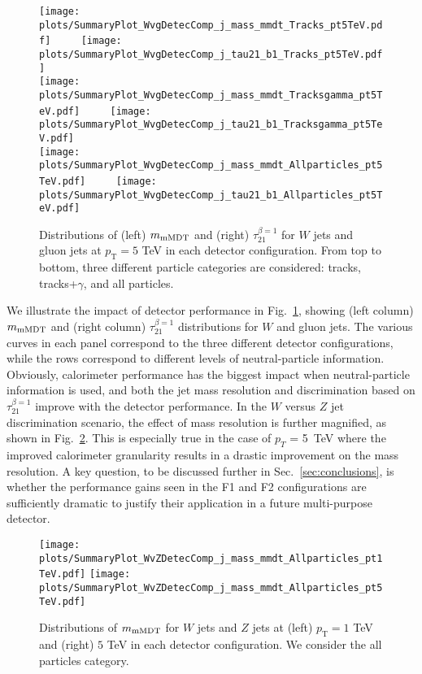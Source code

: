 \documentclass[11pt,letterpaper]{article}
\DeclareRobustCommand{\Sec}[1]{Sec.~\ref{#1}}
\DeclareRobustCommand{\Fig}[1]{Fig.~\ref{#1}}
\newcommand{\pt}{p_{\mathrm{T}}}
\begin{document}
\begin{figure}[p]
\begin{center}
\texttt{[image: plots/SummaryPlot\_WvgDetecComp\_j\_mass\_mmdt\_Tracks\_pt5TeV.pdf]}
$\qquad$
\texttt{[image: plots/SummaryPlot\_WvgDetecComp\_j\_tau21\_b1\_Tracks\_pt5TeV.pdf]}\\
\texttt{[image: plots/SummaryPlot\_WvgDetecComp\_j\_mass\_mmdt\_Tracksgamma\_pt5TeV.pdf]}
$\qquad$
\texttt{[image: plots/SummaryPlot\_WvgDetecComp\_j\_tau21\_b1\_Tracksgamma\_pt5TeV.pdf]}\\
\texttt{[image: plots/SummaryPlot\_WvgDetecComp\_j\_mass\_mmdt\_Allparticles\_pt5TeV.pdf]}
$\qquad$
\texttt{[image: plots/SummaryPlot\_WvgDetecComp\_j\_tau21\_b1\_Allparticles\_pt5TeV.pdf]}\\
\end{center}
\caption{Distributions of (left) ${m}_{\rm mMDT}$ and (right) $\tau_{21}^{\beta=1}$ for $W$ jets and gluon jets at $\pt = 5$ TeV in each detector configuration. From top to bottom, three different particle categories are considered: tracks, tracks+$\gamma$, and all particles.}
\label{fig:SummaryPlots_Wvq_DetectorComparison}
\end{figure}


We illustrate the impact of detector performance in \Fig{fig:SummaryPlots_Wvq_DetectorComparison}, showing (left column) ${m}_{\rm mMDT}$ and (right column) $\tau_{21}^{\beta=1}$ distributions for $W$ and gluon jets.
%
The various curves in each panel correspond to the three different detector configurations, while the rows correspond to different levels of neutral-particle information.
%
Obviously, calorimeter performance has the biggest impact when neutral-particle information is used, and both the jet mass resolution and discrimination based on $\tau_{21}^{\beta=1}$ improve with the detector performance.
%
In the $W$ versus $Z$ jet discrimination scenario, the effect of mass resolution is further magnified, as shown in \Fig{fig:SummaryPlots_WvZ_DetecComparison}.
%
This is especially true in the case of $p_T$ = 5~TeV where the improved calorimeter granularity results in a drastic improvement on the mass resolution.
%
A key question, to be discussed further in \Sec{sec:conclusions}, is whether the performance gains seen in the F1 and F2 configurations are sufficiently dramatic to justify their application in a future multi-purpose detector.

\begin{figure}[tp]
\begin{center}
\texttt{[image: plots/SummaryPlot\_WvZDetecComp\_j\_mass\_mmdt\_Allparticles\_pt1TeV.pdf]}
\texttt{[image: plots/SummaryPlot\_WvZDetecComp\_j\_mass\_mmdt\_Allparticles\_pt5TeV.pdf]}
\end{center}
\caption{Distributions of ${m}_{\rm mMDT}$ for $W$ jets and $Z$ jets at (left) $\pt = 1$ TeV  and (right) $5$ TeV in each detector configuration.  We consider the all particles category.}
\label{fig:SummaryPlots_WvZ_DetecComparison}
\end{figure}
\end{document}
